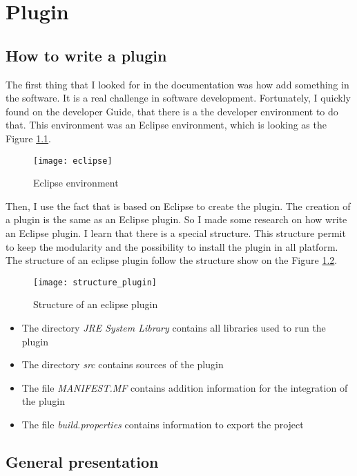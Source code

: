 
\chapter{Plugin}
\label{chap:results}


\section{How to write a plugin}


The first thing that I looked for in the \umld documentation was how add something in the software. It is a real challenge in software development. Fortunately, I quickly found on the \umld developer Guide, that there is a the developer environment to do that. This environment was an Eclipse environment, which is looking as the Figure \ref{fig:eclipse}.

\begin{figure}[h]
  \centering
  \texttt{[image: eclipse]}
  \caption{Eclipse environment}
  \label{fig:eclipse}
\end{figure}

Then, I use the fact that \umld is based on Eclipse to create the plugin. The creation of a plugin is the same as an Eclipse plugin. So I made some research on how write an Eclipse plugin. I learn that there is a special structure. This structure permit to keep the modularity and the possibility to install the plugin in all platform. The structure of an eclipse plugin follow the structure show on the Figure \ref{fig:plugin}.

\begin{figure}[h]
  \centering
  \texttt{[image: structure\_plugin]}
  \caption{Structure of an eclipse plugin}
  \label{fig:plugin}
\end{figure}

\noitemsep
\begin{itemize}
\item The directory \textit{JRE System Library} contains all libraries used to run the plugin
\item The directory \textit{src} contains sources of the plugin
\item The file \textit{MANIFEST.MF} contains addition information for the integration of the plugin
\item The file \textit{build.properties} contains information to export the project
\end{itemize}
\doitemsep

\section{General presentation}

